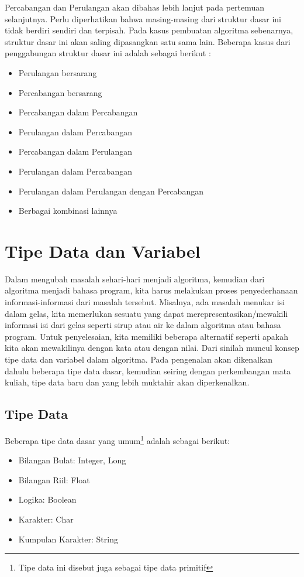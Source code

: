 Percabangan dan Perulangan akan dibahas lebih lanjut pada pertemuan selanjutnya. Perlu diperhatikan bahwa masing-masing dari struktur dasar ini tidak berdiri sendiri dan terpisah. Pada kasus pembuatan algoritma sebenarnya, struktur dasar ini akan saling dipasangkan satu sama lain. Beberapa kasus dari penggabungan struktur dasar ini adalah sebagai berikut : 
\begin{itemize}
	\item Perulangan bersarang
	\item	Percabangan bersarang
	\item	Percabangan dalam Percabangan 
	\item	Perulangan dalam Percabangan 
	\item	Percabangan dalam Perulangan 
	\item	Perulangan dalam Percabangan
	\item	Perulangan dalam Perulangan dengan Percabangan
	\item	Berbagai kombinasi lainnya
\end{itemize}


\section{Tipe Data dan Variabel}
Dalam mengubah masalah sehari-hari menjadi algoritma, kemudian dari algoritma menjadi bahasa program, kita harus melakukan proses penyederhanaan informasi-informasi dari masalah tersebut. Misalnya, ada masalah menukar isi dalam gelas, kita memerlukan sesuatu yang dapat merepresentasikan/mewakili informasi isi dari gelas seperti sirup atau air  ke dalam algoritma atau bahasa program. Untuk penyelesaian, kita memiliki beberapa alternatif seperti apakah kita akan mewakilinya dengan kata atau dengan nilai. Dari sinilah muncul konsep tipe data dan variabel dalam algoritma. Pada pengenalan akan dikenalkan dahulu beberapa tipe data dasar, kemudian seiring dengan perkembangan mata kuliah, tipe data baru dan yang lebih muktahir akan diperkenalkan.

\subsection{Tipe Data}	
Beberapa tipe data dasar yang umum\footnote{Tipe data ini disebut juga sebagai tipe data primitif} adalah sebagai berikut: 
\begin{itemize}
	\item Bilangan Bulat: Integer, Long
	\item	Bilangan Riil: Float
	\item	Logika: Boolean
	\item	Karakter: Char
	\item	Kumpulan Karakter: String 
\end{itemize}

